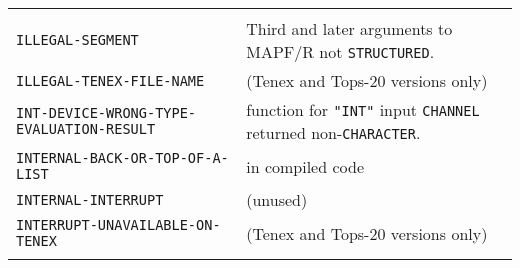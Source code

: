 \documentclass[a4paper]{scrbook}
\begin{document}
\begin{longtable}[]{@{}ll@{}}
\begin{minipage}[t]{0.36\columnwidth}
\strut
\end{minipage}\tabularnewline
\begin{minipage}[t]{0.58\columnwidth}\raggedright\strut
\texttt{ILLEGAL-SEGMENT}\strut
\end{minipage} & \begin{minipage}[t]{0.36\columnwidth}\raggedright\strut
Third and later arguments to MAPF/R not \texttt{STRUCTURED}.\strut
\end{minipage}\tabularnewline
\begin{minipage}[t]{0.58\columnwidth}\raggedright\strut
\texttt{ILLEGAL-TENEX-FILE-NAME}\strut
\end{minipage} & \begin{minipage}[t]{0.36\columnwidth}\raggedright\strut
(Tenex and Tops-20 versions only)\strut
\end{minipage}\tabularnewline
\begin{minipage}[t]{0.58\columnwidth}\raggedright\strut
\texttt{INT-DEVICE-WRONG-TYPE-EVALUATION-RESULT}\strut
\end{minipage} & \begin{minipage}[t]{0.36\columnwidth}\raggedright\strut
function for \texttt{"INT"} input \texttt{CHANNEL} returned non-\texttt{CHARACTER}.\strut
\end{minipage}\tabularnewline
\begin{minipage}[t]{0.58\columnwidth}\raggedright\strut
\texttt{INTERNAL-BACK-OR-TOP-OF-A-LIST}\strut
\end{minipage} & \begin{minipage}[t]{0.36\columnwidth}\raggedright\strut
in compiled code\strut
\end{minipage}\tabularnewline
\begin{minipage}[t]{0.58\columnwidth}\raggedright\strut
\texttt{INTERNAL-INTERRUPT}\strut
\end{minipage} & \begin{minipage}[t]{0.36\columnwidth}\raggedright\strut
(unused)\strut
\end{minipage}\tabularnewline
\begin{minipage}[t]{0.58\columnwidth}\raggedright\strut
\texttt{INTERRUPT-UNAVAILABLE-ON-TENEX}\strut
\end{minipage} & \begin{minipage}[t]{0.36\columnwidth}\raggedright\strut
(Tenex and Tops-20 versions only)\strut
\end{minipage}\tabularnewline
\begin{minipage}[t]{0.58\columnwidth}\raggedright\strut

\end{minipage}
\end{longtable}
\end{document}
